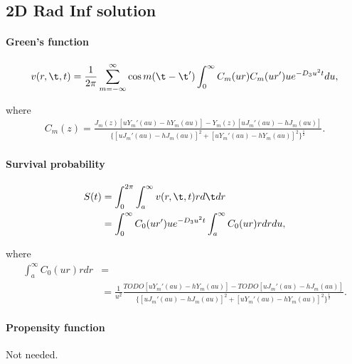 \subsection{2D Rad Inf solution}

\paragraph{Green's function}
\begin{align}
  v(r,\t, t) = \frac{1}{2\pi}
  \sum_{m=-\infty}^{\infty} \cos m(\t-\t')
  \int_0^{\infty} C_m(ur)C_m(ur')u e^{-D_3 u^2 t} du,
\end{align}

where
\begin{align}
  C_m(z) =
  \frac{ J_m(z) [uY_m'(au) - hY_m(au)] -
	 Y_m(z) [uJ_m'(au) - hJ_m(au)] }
       { \{ [u J_m'(au) - hJ_m(au)]^2 +
	    [u Y_m'(au) - hY_m(au)]^2  \}^\frac{1}{2} }.
\end{align}


\paragraph{Survival probability}
\begin{align}
  S(t) &= \int_0^{2\pi}\int_a^{\infty} v(r,\t,t)rd\t dr\\
  &=
  \int_0^{\infty} C_0(ur')u e^{-D_3 u^2 t}
  \int_a^{\infty}C_0(ur) r dr du,
\end{align}

where
\begin{align}
  \int_a^{\infty}C_0(ur) r dr &= \\
  &= \frac{1}{u^2}
  \frac{ TODO [uY_m'(au) - hY_m(au)] -
	 TODO [uJ_m'(au) - hJ_m(au)] }
       { \{ [u J_m'(au) - hJ_m(au)]^2 +
	    [u Y_m'(au) - hY_m(au)]^2  \}^\frac{1}{2} }.
\end{align}


\paragraph{Propensity function}
Not needed.
